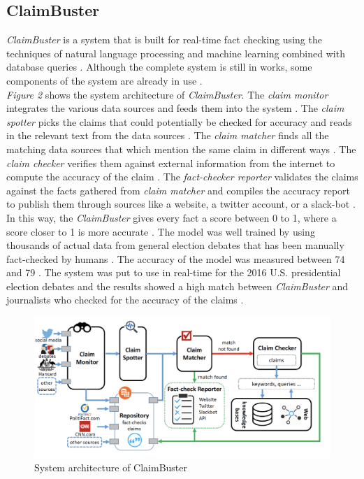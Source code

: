 \documentclass[sigconf]{acmart}
\begin{document}
\subsection{ClaimBuster}
{\em ClaimBuster} is a system that is built for real-time fact checking using the techniques of natural language processing and machine learning combined with database queries \cite{Claimbuster2017}. Although the complete system is still in works, some components of the system are already in use \cite{Claimbuster2017}.\\
{\em Figure 2} shows the system architecture of {\em ClaimBuster}. The {\em claim monitor} integrates the various data sources and feeds them into the system \cite{Claimbuster2017}. The {\em claim spotter} picks the claims that could potentially be checked for accuracy and reads in the relevant text from the data sources \cite{Claimbuster2017}. The {\em claim matcher} finds all the matching data sources that which mention the same claim in different ways \cite{Claimbuster2017}. The {\em claim checker} verifies them against external information from the internet to compute the accuracy of the claim \cite{Claimbuster2017}. The {\em fact-checker reporter} validates the claims against the facts gathered from {\em claim matcher} and compiles the accuracy report to publish them through sources like a website, a twitter account, or a slack-bot \cite{Claimbuster2017}. \\
In this way, the {\em ClaimBuster} gives every fact a score between 0 to 1, where a score closer to 1 is more accurate \cite{Claimbuster2017}. The model was well trained by using thousands of actual data from general election debates that has been manually fact-checked by humans \cite{Claimbuster2017}. The accuracy of the model was measured between 74 and 79 \cite{Claimbuster2017}. The system was put to use in real-time for the 2016 U.S. presidential election debates and the results showed a high match between {\em ClaimBuster} and journalists who checked for the accuracy of the claims \cite{Claimbuster2017}.  

\begin{figure}
\includegraphics[width=1.0\textwidth]{images/fig2.png}
\caption{System architecture of ClaimBuster \cite{Claimbuster2017}}
\end{figure}
\end{document}
